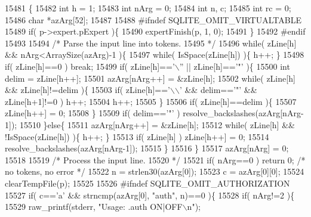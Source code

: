 \begin{DoxyCode}
15481                                                       \{
15482   \textcolor{keywordtype}{int} h = 1;
15483   \textcolor{keywordtype}{int} nArg = 0;
15484   \textcolor{keywordtype}{int} n, c;
15485   \textcolor{keywordtype}{int} rc = 0;
15486   \textcolor{keywordtype}{char} *azArg[52];
15487 
15488 \textcolor{preprocessor}{#ifndef SQLITE\_OMIT\_VIRTUALTABLE}
15489   \textcolor{keywordflow}{if}( p->expert.pExpert )\{
15490     expertFinish(p, 1, 0);
15491   \}
15492 \textcolor{preprocessor}{#endif}
15493 
15494   \textcolor{comment}{/* Parse the input line into tokens.}
15495 \textcolor{comment}{  */}
15496   \textcolor{keywordflow}{while}( zLine[h] && nArg<ArraySize(azArg)-1 )\{
15497     \textcolor{keywordflow}{while}( IsSpace(zLine[h]) )\{ h++; \}
15498     \textcolor{keywordflow}{if}( zLine[h]==0 ) \textcolor{keywordflow}{break};
15499     \textcolor{keywordflow}{if}( zLine[h]==\textcolor{charliteral}{'\(\backslash\)''} || zLine[h]==\textcolor{charliteral}{'"'} )\{
15500       \textcolor{keywordtype}{int} delim = zLine[h++];
15501       azArg[nArg++] = &zLine[h];
15502       \textcolor{keywordflow}{while}( zLine[h] && zLine[h]!=delim )\{
15503         \textcolor{keywordflow}{if}( zLine[h]==\textcolor{charliteral}{'\(\backslash\)\(\backslash\)'} && delim==\textcolor{charliteral}{'"'} && zLine[h+1]!=0 ) h++;
15504         h++;
15505       \}
15506       \textcolor{keywordflow}{if}( zLine[h]==delim )\{
15507         zLine[h++] = 0;
15508       \}
15509       \textcolor{keywordflow}{if}( delim==\textcolor{charliteral}{'"'} ) resolve_backslashes(azArg[nArg-1]);
15510     \}\textcolor{keywordflow}{else}\{
15511       azArg[nArg++] = &zLine[h];
15512       \textcolor{keywordflow}{while}( zLine[h] && !IsSpace(zLine[h]) )\{ h++; \}
15513       \textcolor{keywordflow}{if}( zLine[h] ) zLine[h++] = 0;
15514       resolve_backslashes(azArg[nArg-1]);
15515     \}
15516   \}
15517   azArg[nArg] = 0;
15518 
15519   \textcolor{comment}{/* Process the input line.}
15520 \textcolor{comment}{  */}
15521   \textcolor{keywordflow}{if}( nArg==0 ) \textcolor{keywordflow}{return} 0; \textcolor{comment}{/* no tokens, no error */}
15522   n = strlen30(azArg[0]);
15523   c = azArg[0][0];
15524   clearTempFile(p);
15525 
15526 \textcolor{preprocessor}{#ifndef SQLITE\_OMIT\_AUTHORIZATION}
15527   \textcolor{keywordflow}{if}( c==\textcolor{charliteral}{'a'} && strncmp(azArg[0], \textcolor{stringliteral}{"auth"}, n)==0 )\{
15528     \textcolor{keywordflow}{if}( nArg!=2 )\{
15529       raw_printf(stderr, \textcolor{stringliteral}{"Usage: .auth ON|OFF\(\backslash\)n"});

\end{DoxyCode}
